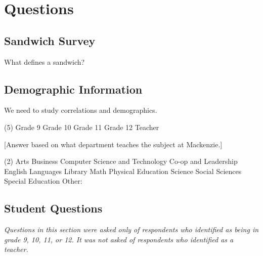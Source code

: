 \chapter{Questions}

\section{Sandwich Survey}
	What defines a sandwich?

\section{Demographic Information}
	We need to study correlations and demographics.

	\begin{minipage}{\textwidth}
		\begin{singlechoice}(5)
			\choice Grade 9
			\choice Grade 10
			\choice Grade 11
			\choice Grade 12
			\choice Teacher
		\end{singlechoice}
	\end{minipage}
	
	\begin{minipage}{\textwidth}
		[Answer based on what department teaches the subject at Mackenzie.]

		\raggedright
		\begin{multiplechoice}(2)
			\choice Arts
			\choice Business
			\choice Computer Science and Technology
			\choice Co-op and Leadership
			\choice English
			\choice Languages
			\choice Library
			\choice Math
			\choice Physical Education
			\choice Science
			\choice Social Sciences
			\choice Special Education
			\choice Other: \blank
		\end{multiplechoice}
	\end{minipage}
	
	\begin{minipage}{\textwidth}
	\end{minipage}

\section{Student Questions}
	\textit{Questions in this section were asked only of respondents who identified as being in grade 9, 10, 11, or 12.
	It was not asked of respondents who identified as a teacher.}

